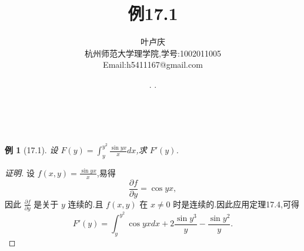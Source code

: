 \documentclass[a4paper, 12pt]{article} %
\makeatletter
\newtheorem*{pdtheorem}{例}
\newenvironment{example}
{\bigskip\begin{mdframed}[backgroundcolor=gray!40,rightline=false,leftline=false,topline=false,bottomline=false]\begin{pdtheorem}}
    {\end{pdtheorem}\end{mdframed}\bigskip}
\renewcommand{\maketitle}{ %
  \renewcommand\refname{参考文献}
  \newcommand{\D}{\displaystyle}\newcommand{\ri}{\Rightarrow}
  \newcommand{\ds}{\displaystyle} \renewcommand{\ni}{\noindent}
  \newcommand{\pa}{\partial} \newcommand{\Om}{\Omega}
  \newcommand{\om}{\omega} \newcommand{\sik}{\sum_{i=1}^k}
  \newcommand{\vov}{\Vert\omega\Vert} \newcommand{\Umy}{U_{\mu_i,y^i}}
  \newcommand{\lamns}{\lambda_n^{^{\scriptstyle\sigma}}}
  \newcommand{\chiomn}{\chi_{_{\Omega_n}}}
  \newcommand{\ullim}{\underline{\lim}} \newcommand{\bsy}{\boldsymbol}
  \newcommand{\mvb}{\mathversion{bold}} \newcommand{\la}{\lambda}
  \newcommand{\La}{\Lambda} \newcommand{\va}{\varepsilon}
  \newcommand{\be}{\beta} \newcommand{\al}{\alpha}
  \newcommand{\dis}{\displaystyle} \newcommand{\R}{{\mathbb R}}
  \newcommand{\N}{{\mathbb N}} \newcommand{\cF}{{\mathcal F}}
  \newcommand{\gB}{{\mathfrak B}} \newcommand{\eps}{\epsilon}
  \begin{flushright} %
    {\LARGE\@title} %
    
    \vspace{50pt} %
    
    {\large\@author} %
    \\\@date %
    
    \vspace{40pt} %
  \end{flushright}
}
\makeatother
\begin{document}
\begin{CJK}{UTF8}{gkai}
  \title{\textbf{例17.1}} 
  \author{\small{叶卢庆}\\{\small{杭州师范大学理学院,学号:1002011005}}\\{\small{Email:h5411167@gmail.com}}} %
  \renewcommand{\today}{\number\year. \number\month. \number\day}
  \date{\today} %
  
  
  
  \maketitle %
  
  
  
  
  
  
  
  \begin{example}[17.1]
设 $F(y)=\int_y^{y^2}\frac{\sin yx}{x}dx$,求 $F'(y)$.    
  \end{example}
  \begin{proof}[证明]
设 $f(x,y)=\frac{\sin yx}{x}$,易得
$$
\frac{\pa f}{\pa y}=\cos yx,
$$
因此 $\frac{\pa f}{\pa y}$ 是关于 $y$ 连续的.且 $f(x,y)$ 在 $x\neq 0$
时是连续的.因此应用定理17.4,可得
$$
F'(y)=\int_y^{y^2}\cos yxdx+2 \frac{\sin y^{3}}{y    }-\frac{\sin y^{2}}{y}.
$$
  \end{proof}
  
  
  
  
  
\end{CJK}
\end{document}
